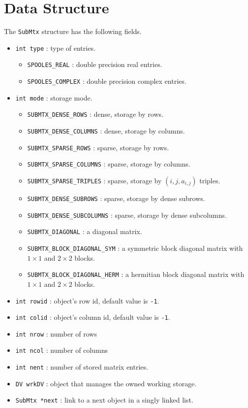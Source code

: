 \par
\section{Data Structure}
\label{section:SubMtx:dataStructure}
\par
\par
The {\tt SubMtx} structure has the following fields.
\begin{itemize}
\item
{\tt int type} : type of entries.
\begin{itemize}
\item {\tt SPOOLES\_REAL} : double precision real entries.
\item {\tt SPOOLES\_COMPLEX} : double precision complex entries.
\end{itemize}
\item
{\tt int mode} : storage mode.
\begin{itemize}
\item {\tt SUBMTX\_DENSE\_ROWS} : dense, storage by rows.
\item {\tt SUBMTX\_DENSE\_COLUMNS} : dense, storage by columns.
\item {\tt SUBMTX\_SPARSE\_ROWS} : sparse, storage by rows.
\item {\tt SUBMTX\_SPARSE\_COLUMNS} : sparse, storage by columns.
\item {\tt SUBMTX\_SPARSE\_TRIPLES} : sparse, storage by 
      $(i,j,a_{i,j})$ triples.
\item {\tt SUBMTX\_DENSE\_SUBROWS} : sparse, storage by dense subrows.
\item {\tt SUBMTX\_DENSE\_SUBCOLUMNS} : 
      sparse, storage by dense subcolumns.
\item {\tt SUBMTX\_DIAGONAL} : a diagonal matrix.
\item {\tt SUBMTX\_BLOCK\_DIAGONAL\_SYM} : a symmetric block
      diagonal matrix with $1 \times 1$ and $2 \times 2$ blocks.
\item {\tt SUBMTX\_BLOCK\_DIAGONAL\_HERM} : a hermitian block
      diagonal matrix with $1 \times 1$ and $2 \times 2$ blocks.
\end{itemize}
\item
{\tt int rowid} : object's row id, default value is {\tt -1}.
\item
{\tt int colid} : object's column id, default value is {\tt -1}.
\item
{\tt int nrow} : number of rows 
\item
{\tt int ncol} : number of columns 
\item
{\tt int nent} : number of stored matrix entries.
\item
{\tt DV wrkDV} : 
object that manages the owned working storage.
\item
{\tt SubMtx *next} : 
link to a next object in a singly linked list.
\end{itemize}
